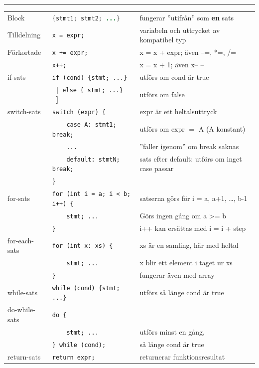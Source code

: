 \documentclass[article, a5paper]{memoir}
\newcommand{\OptL}{\textbf{\textcolor{grammarcolor}{~[~}}}
\newcommand{\OptR}{\textbf{\textcolor{grammarcolor}{~]~}}}
\newcommand{\LangColor}{red}
\newcommand{\head}[1]{{\bfseries {\color{\LangColor}{#1}}\par\vspace{1mm}\hrule\vspace{-2mm}}}
\newcommand{\secend}{\\[1mm]}
\newcommand{\jcode}{\lstinline[basicstyle=\ttfamily,language=Java]}
\newcommand{\Newline}{\vspace{\baselineskip}}
\begin{document}
\Newline
\head{Satser}\Newline
{\small
\begin{tabular}{@{}l l l}
Block   & \jcode|{stmt1; stmt2; ...}| &  fungerar ''utifrån'' som \textbf{en} sats \secend

Tilldelning & \verb|x = expr;|                 &  variabeln och uttrycket av kompatibel typ \secend

Förkortade       & \verb|x += expr; |                &  x = x + expr; även --=, *=, /= \\
                 & \verb|x++;  |                     &  x = x + 1; även x\hspace{0.5mm}-- -- \secend

if-sats          & \verb|if (cond) {stmt; ...}|      &  utförs om cond är true \\
                 & \OptL \verb|else { stmt; ...}| \OptR&  utförs om false \secend

switch-sats      & \verb|switch (expr) {|         &  expr är ett heltalsuttryck \\ 
                 & \verb|    case A: stmt1; break;|  &  utförs om expr $=$ A (A konstant) \\
                 & \verb|    ...|                 & ''faller igenom'' om break saknas\\
                 & \verb|    default: stmtN; break;| &  sats efter default: utförs om inget case passar\\
                 & \verb|}|                   & \secend

for-sats         & \verb|for (int i = a; i < b; i++) {| & satserna görs för i = a, a+1, \ldots, b-1\\
                 & \verb|    stmt; ...|  & Görs ingen gång om a >= b \\
                 & \verb|}  |         &  i++ kan ersättas med i = i + step \secend
                 
for-each-sats    & \verb|for (int x: xs) {|   & xs är en samling, här med heltal  \secend
                 & \verb|    stmt; ...|  & x blir ett element i taget ur xs\\
                 & \verb|}  |         &  fungerar även med array \secend

while-sats       & \verb|while (cond) {stmt; ...}|          & utförs så länge cond är true \secend

do-while-sats    & \verb|do {|                     & \\
                 & \verb|    stmt; ...|         &  utförs minst en gång, \\
                 & \verb|} while (cond);|          &  så länge cond är true \secend

return-sats      & \verb|return expr;|        &  returnerar funktionsresultat
\end{tabular}
}
\end{document}
